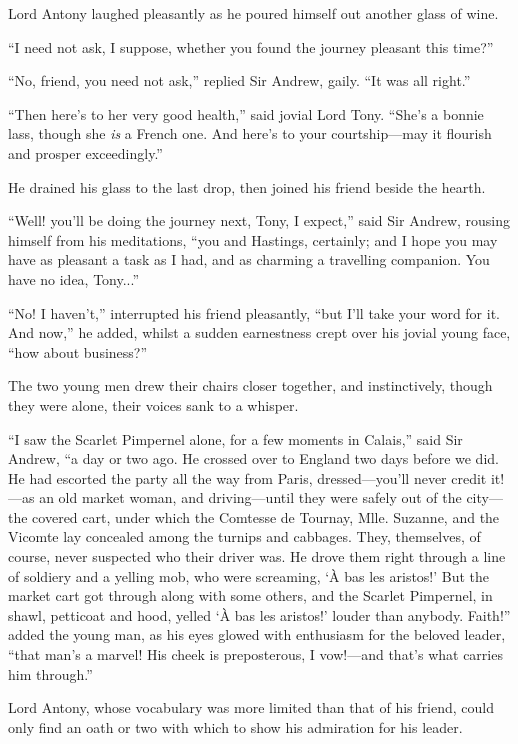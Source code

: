 \documentclass[paper=a5,BCOR=7mm,twoside,DIV=calc,12pt,usegeometry,chapterprefix,endperiod,headings=big]{scrbook}
\begin{document}
Lord Antony laughed pleasantly as he poured himself out another glass of wine.

\enquote{I need not ask, I suppose, whether you found the journey pleasant this time?}

\enquote{No, friend, you need not ask,} replied Sir Andrew, gaily. \enquote{It was all right.}

\enquote{Then here's to her very good health,} said jovial Lord Tony. \enquote{She's a bonnie lass, though she \textit{is} a French one. And here's to your courtship---may it flourish and prosper exceedingly.}

He drained his glass to the last drop, then joined his friend beside the hearth.

\enquote{Well! you'll be doing the journey next, Tony, I expect,} said Sir Andrew, rousing himself from his meditations, \enquote{you and Hastings, certainly; and I hope you may have as pleasant a task as I had, and as charming a travelling companion. You have no idea, Tony...}

\enquote{No! I haven't,} interrupted his friend pleasantly, \enquote{but I'll take your word for it. And now,} he added, whilst a sudden earnestness crept over his jovial young face, \enquote{how about business?}

The two young men drew their chairs closer together, and instinctively, though they were alone, their voices sank to a whisper.

\enquote{I saw the Scarlet Pimpernel alone, for a few moments in Calais,} said Sir Andrew, \enquote{a day or two ago. He crossed over to England two days before we did. He had escorted the party all the way from Paris, dressed---you'll never credit it!---as an old market woman, and driving---until they were safely out of the city---the covered cart, under which the Comtesse de Tournay, Mlle. Suzanne, and the Vicomte lay concealed among the turnips and cabbages. They, themselves, of course, never suspected who their driver was. He drove them right through a line of soldiery and a yelling mob, who were screaming, \enquote{À bas les aristos!} But the market cart got through along with some others, and the Scarlet Pimpernel, in shawl, petticoat and hood, yelled \enquote{À bas les aristos!} louder than anybody. Faith!} added the young man, as his eyes glowed with enthusiasm for the beloved leader, \enquote{that man's a marvel! His cheek is preposterous, I vow!---and that's what carries him through.}

Lord Antony, whose vocabulary was more limited than that of his friend, could only find an oath or two with which to show his admiration for his leader.
\end{document}
